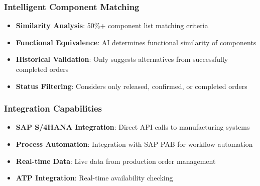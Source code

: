 \subsubsection{Intelligent Component Matching}
\begin{itemize}
    \item \textbf{Similarity Analysis}: 50\%+ component list matching criteria
    \item \textbf{Functional Equivalence}: AI determines functional similarity of components
    \item \textbf{Historical Validation}: Only suggests alternatives from successfully completed orders
    \item \textbf{Status Filtering}: Considers only released, confirmed, or completed orders
\end{itemize}

\subsubsection{Integration Capabilities}
\begin{itemize}
    \item \textbf{SAP S/4HANA Integration}: Direct API calls to manufacturing systems
    \item \textbf{Process Automation}: Integration with SAP PAB for workflow automation
    \item \textbf{Real-time Data}: Live data from production order management
    \item \textbf{ATP Integration}: Real-time availability checking
\end{itemize}
